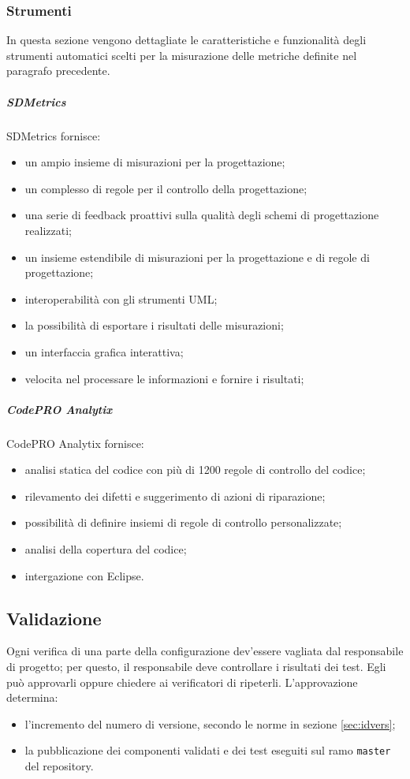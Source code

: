 	\subsubsection{Strumenti}
	In questa sezione vengono dettagliate le caratteristiche e funzionalità degli strumenti automatici scelti per la misurazione delle metriche definite nel paragrafo precedente.
		\subparagraph{SDMetrics}
		SDMetrics fornisce:
		\begin{itemize}
			\item un ampio insieme di misurazioni per la progettazione;
			\item un complesso di regole per il controllo della progettazione;
			\item una serie di feedback proattivi sulla qualità degli schemi di progettazione realizzati;
			\item un insieme estendibile di misurazioni per la progettazione e di regole di progettazione;
			\item interoperabilità con gli strumenti UML;
			\item la possibilità di esportare i risultati delle misurazioni;
			\item un interfaccia grafica interattiva;
			\item velocita nel processare le informazioni e fornire i risultati;
		\end{itemize}

		\subparagraph{CodePRO Analytix}
		CodePRO Analytix fornisce:
		\begin{itemize}
			\item analisi statica del codice con più di 1200 regole di controllo del codice;
			\item rilevamento dei difetti e suggerimento di azioni di riparazione;
			\item possibilità di definire insiemi di regole di controllo personalizzate;
			\item analisi della copertura del codice;
			\item intergazione con Eclipse.
		\end{itemize}

\subsection{Validazione}
Ogni verifica di una parte della configurazione dev'essere vagliata dal responsabile di progetto; per questo, il responsabile deve controllare i risultati dei test. Egli può approvarli oppure chiedere ai verificatori di ripeterli. L'approvazione determina:
\begin{itemize}
	\item l'incremento del numero di versione, secondo le norme in sezione \ref{sec:idvers};
	\item la pubblicazione dei componenti validati e dei test eseguiti sul ramo \texttt{master} del repository.
\end{itemize}




